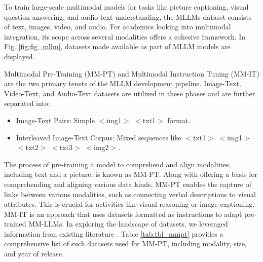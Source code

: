 \documentclass[runningheads]{llncs}
\begin{document}
To train large-scale multimodal models for tasks like picture captioning, visual question answering, and audio-text understanding, the MLLMs dataset \cite{ref3} consists of text, images, video, and audio. For academics looking into multimodal integration, its scope across several modalities offers a cohesive framework. In Fig. \ref{fig:fig_mllm}, datasets made available as part of MLLM models are displayed. 

Multimodal Pre-Training (MM-PT) and Multimodal Instruction Tuning (MM-IT) are the two primary tenets of the MLLM development pipeline. Image-Text, Video-Text, and Audio-Text datasets are utilized in these phases and are further separated into:
\begin{itemize}
    \item Image-Text Pairs: Simple $<$img1$>$ $<$txt1$>$ format.
    \item Interleaved Image-Text Corpus: Mixed sequences like $<$txt1$>$ $<$img1$>$ $<$txt2$>$ $<$txt3$>$ $<$img2$>$.
\end{itemize}

The process of pre-training a model to comprehend and align modalities, including text and a picture, is known as MM-PT. Along with offering a basis for comprehending and aligning various data kinds, MM-PT enables the capture of links between various modalities, such as connecting verbal descriptions to visual attributes. This is crucial for activities like visual reasoning or image captioning. MM-IT is an approach that uses datasets formatted as instructions to adapt pre-trained MM-LLMs. In exploring the landscape of datasets, we leveraged information from existing literature \cite{ref139,ref133,ref132}. Table \ref{tab:tbl_mmpt} provides a comprehensive list of such datasets used for MM-PT, including modality, size, and year of release. 
\end{document}
